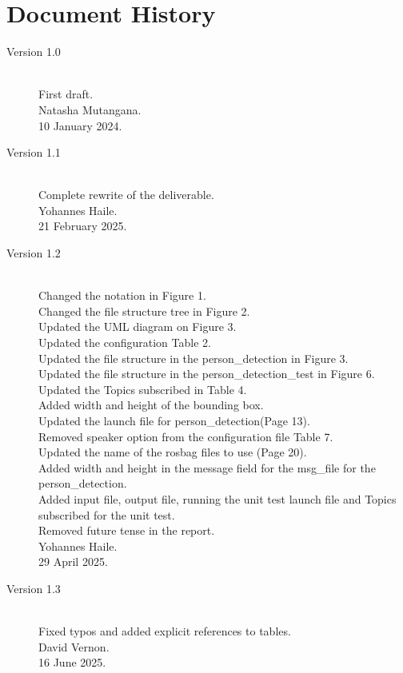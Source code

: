 \documentclass{CSSRforAfrica}
\begin{document}
  
\newpage
\section*{Document History}
\label{document_history}

\begin{description}
\item [Version 1.0]~\\
First draft.\\
Natasha Mutangana.\\
10 January 2024.

\item [Version 1.1]~\\
Complete rewrite of the deliverable.\\
Yohannes Haile. \\   
21 February 2025.   

\item [Version 1.2]~\\
Changed the notation in Figure 1.\\
Changed the file structure tree in Figure 2.\\
Updated the UML diagram on Figure 3. \\
Updated the configuration Table 2.\\
Updated the file structure in the person\_detection in Figure 3.\\
Updated the file structure in the person\_detection\_test in Figure 6.\\
Updated the Topics subscribed in Table 4. \\
Added width and height of the bounding box. \\
Updated the launch file for person\_detection(Page 13).\\
Removed speaker option from the configuration file Table 7. \\
Updated the name of the rosbag files to use (Page 20).\\
Added width and height in the message field for the msg\_file for the person\_detection.\\
Added input file, output file, running the unit test launch file and Topics subscribed for the unit test.\\
Removed future tense in the report.\\
Yohannes Haile. \\                                    
29 April 2025.  

\item [Version 1.3]~\\
Fixed typos and added explicit references to tables.\\
David Vernon. \\   
16 June 2025.   

 
\end{description}
\end{document}
